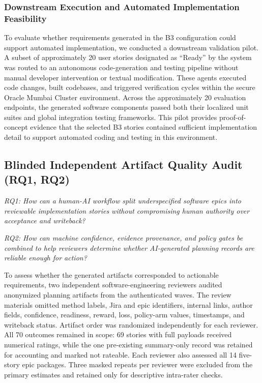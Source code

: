 \documentclass[manuscript,review]{acmart}
\begin{document}
\subsubsection{Downstream Execution and Automated Implementation Feasibility}\label{sec:downstream-implementation-pilot}
To evaluate whether requirements generated in the B3 configuration could support automated implementation, we conducted a downstream validation pilot. A subset of approximately 20 user stories designated as ``Ready'' by the system was routed to an autonomous code-generation and testing pipeline without manual developer intervention or textual modification. These agents executed code changes, built codebases, and triggered verification cycles within the secure Oracle Mumbai Cluster environment. Across the approximately 20 evaluation endpoints, the generated software components passed both their localized unit suites and global integration testing frameworks. This pilot provides proof-of-concept evidence that the selected B3 stories contained sufficient implementation detail to support automated coding and testing in this environment.

\subsection{Blinded Independent Artifact Quality Audit (RQ1, RQ2)}

\noindent\textit{RQ1: How can a human-AI workflow split underspecified software epics into reviewable implementation stories without compromising human authority over acceptance and writeback?}\par
\noindent\textit{RQ2: How can machine confidence, evidence provenance, and policy gates be combined to help reviewers determine whether AI-generated planning records are reliable enough for action?}\par

To assess whether the generated artifacts corresponded to actionable requirements, two independent software-engineering reviewers audited anonymized planning artifacts from the authenticated waves. The review materials omitted method labels, Jira and epic identifiers, internal links, author fields, confidence, readiness, reward, loss, policy-arm values, timestamps, and writeback status. Artifact order was randomized independently for each reviewer. All 70 outcomes remained in scope: 69 stories with full payloads received numerical ratings, while the one pre-existing summary-only record was retained for accounting and marked not rateable. Each reviewer also assessed all 14 five-story epic packages. Three masked repeats per reviewer were excluded from the primary estimates and retained only for descriptive intra-rater checks.
\end{document}
